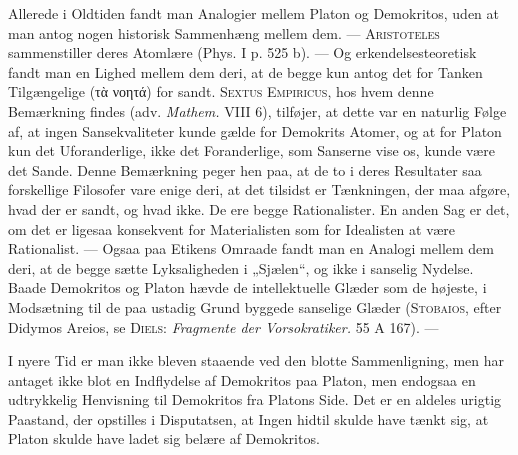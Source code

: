\documentclass[12pt,a4paper,openany]{book}
\begin{document}
Allerede i Oldtiden fandt man Analogier mellem Platon og
Demokritos, uden at man antog nogen historisk Sammenhæng
mellem dem. --- \textsc{Aristoteles} sammenstiller deres Atomlære
(Phys. I p. 525 b). --- Og erkendelsesteoretisk fandt man en
Lighed mellem dem deri, at de begge kun antog det for Tanken
Tilgængelige (τὰ νοητά) for sandt. \textsc{Sextus Empiricus}, hos
hvem denne Bemærkning findes (adv. \textit{Mathem.} VIII 6), tilføjer,
at dette var en naturlig Følge af, at ingen Sansekvaliteter kunde
gælde for Demokrits Atomer, og at for Platon kun det Uforanderlige,
ikke det Foranderlige, som Sanserne vise os, kunde
være det Sande. Denne Bemærkning peger hen paa, at de to
i deres Resultater saa forskellige Filosofer vare enige deri, at
det tilsidst er Tænkningen, der maa afgøre, hvad der er sandt,
og hvad ikke. De ere begge Rationalister. En anden Sag er det,
om det er ligesaa konsekvent for Materialisten som for Idealisten
at være Rationalist. --- Ogsaa paa Etikens Omraade fandt
man en Analogi mellem dem deri, at de begge sætte Lyksaligheden
i „Sjælen“, og ikke i sanselig Nydelse. Baade Demokritos
og Platon hævde de intellektuelle Glæder som de højeste,
i Modsætning til de paa ustadig Grund byggede sanselige Glæder
(\textsc{Stobaios}, efter Didymos Areios, se \textsc{Diels}: \textit{Fragmente der
Vorsokratiker.} 55 A 167). ---

I nyere Tid er man ikke bleven staaende ved den blotte
Sammenligning, men har antaget ikke blot en Indflydelse af
Demokritos paa Platon, men endogsaa en udtrykkelig Henvisning
til Demokritos fra Platons Side. Det er en aldeles urigtig
Paastand, der opstilles i Disputatsen, at Ingen hidtil skulde have
tænkt sig, at Platon skulde have ladet sig belære af Demokritos.
\end{document}
